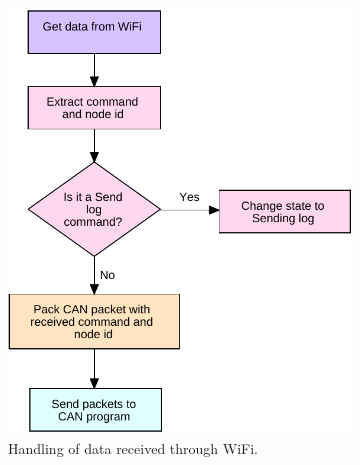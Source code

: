 \begin{figure}[!h]
\centering
\begin{subfigure}[b]{0.42\textwidth}
\centering
\includegraphics[width=1\textwidth]{graphics/FlowChart_NodeWiFiCmd}
\caption{Handling of data received through WiFi.}
\label{fig:FlowChart_NodeWiFiCmd}
\end{subfigure}
~
\begin{subfigure}[b]{0.52\textwidth}
\centering

\end{subfigure}
\end{figure}
